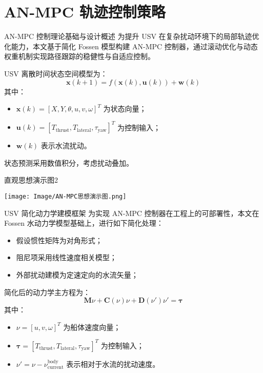 \section{AN-MPC 轨迹控制策略}

\begin{frame}{AN-MPC 控制理论基础与设计概述}
    \justifying
    为提升 USV 在复杂扰动环境下的局部轨迹优化能力，本文基于简化 Fossen 模型构建 AN-MPC 控制器，通过滚动优化与动态权重机制实现路径跟踪的稳健性与自适应控制。
    
    \vspace{0.6em}
    USV 离散时间状态空间模型为：
    \[
    \boldsymbol{x}(k+1) = f(\boldsymbol{x}(k), \boldsymbol{u}(k)) + \boldsymbol{w}(k)
    \]
    其中：
    \begin{itemize}
        \item $\boldsymbol{x}(k) = [X, Y, \theta, u, v, \omega]^T$ 为状态向量；
        \item $\boldsymbol{u}(k) = [T_{\text{thrust}}, T_{\text{lateral}}, \tau_{\text{yaw}}]^T$ 为控制输入；
        \item $\boldsymbol{w}(k)$ 表示水流扰动。
    \end{itemize}
    状态预测采用数值积分，考虑扰动叠加。
\end{frame}

\begin{frame}[plain]{直观思想演示图2}
  \begin{center}
    \texttt{[image: Image/AN-MPC思想演示图.png]}
  \end{center}
\end{frame}

\begin{frame}{USV 简化动力学建模框架}
\justifying
为实现 AN-MPC 控制器在工程上的可部署性，本文在 Fossen 水动力学模型基础上，进行如下简化处理：
\begin{itemize}
    \item 假设惯性矩阵为对角形式；
    \item 阻尼项采用线性速度相关模型；
    \item 外部扰动建模为定速定向的水流矢量；
\end{itemize}

\vspace{0.5em}
简化后的动力学主方程为：
\[
\boldsymbol{M}\nu + \boldsymbol{C}(\nu)\nu + \boldsymbol{D}(\nu')\nu' = \boldsymbol{\tau}
\]
其中：
\begin{itemize}
    \item $\nu = [u, v, \omega]^T$ 为船体速度向量；
    \item $\boldsymbol{\tau} = [T_{\text{thrust}}, T_{\text{lateral}}, \tau_{\text{yaw}}]^T$ 为控制输入；
    \item $\nu' = \nu - \nu_{\text{current}}^{\text{body}}$ 表示相对于水流的扰动速度。
\end{itemize}
\end{frame}

